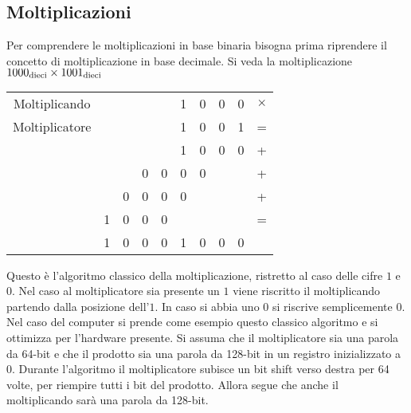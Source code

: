 \documentclass[a4paper,12pt]{article}
\theoremstyle{break}
\numberwithin{equation}{section}
\begin{document}
\subsection{Moltiplicazioni}
Per comprendere le moltiplicazioni in base binaria bisogna prima riprendere il concetto di moltiplicazione in base decimale. Si veda la moltiplicazione \(1000_{\mbox{\scriptsize dieci}} \times 1001_{\mbox{\scriptsize dieci}}\)
\begin{center}
    \begin{tabular}{cccccccccc}
        Moltiplicando & & & & & 1 & 0 & 0 & 0 & \(\times\)\\
        Moltiplicatore & & & & & 1 & 0 & 0 & 1 & =\\
        \hline
        & & & & & 1 & 0 & 0 & 0 & +\\
        & & & 0 & 0 & 0 & 0 & & & +\\
        & & 0 & 0 & 0 & 0 & & & & +\\
        & 1 & 0 & 0 & 0 & & & & & =\\
        \hline
        & 1 & 0 & 0 & 0 & 1 & 0 & 0 & 0 &\\
    \end{tabular}
\end{center}
Questo è l'algoritmo classico della moltiplicazione, ristretto al caso delle cifre \(1\) e \(0\). Nel caso al moltiplicatore sia presente un \(1\) viene riscritto il moltiplicando partendo dalla posizione dell'\(1\). In caso si abbia uno \(0\) si riscrive semplicemente \(0\). 
Nel caso del computer si prende come esempio questo classico algoritmo e si ottimizza per l'hardware presente. Si assuma che il moltiplicatore sia una parola da 64-bit e che il prodotto sia una parola da 128-bit in un registro inizializzato a 0. Durante l'algoritmo il moltiplicatore subisce un bit shift verso destra per 64 volte, per riempire tutti i bit del prodotto. Allora segue che anche il moltiplicando sarà una parola da 128-bit.  
\end{document}
